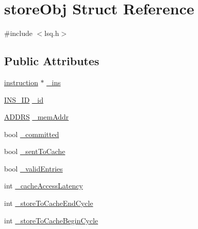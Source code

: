 \hypertarget{structstoreObj}{
\section{storeObj Struct Reference}
\label{structstoreObj}
}


{\ttfamily \#include $<$lsq.h$>$}

\subsection*{Public Attributes}
\begin{DoxyCompactItemize}
\item 
\hyperlink{classinstruction}{instruction} $\ast$ \hyperlink{structstoreObj_a418139c33f75b4d7700a61b0293518d7}{\_\-ins}
\item 
\hyperlink{global_2global_8h_a1883c47d0023d0f200e1d86eced6a070}{INS\_\-ID} \hyperlink{structstoreObj_a993d37ba4f085950507c05564bf99a6a}{\_\-id}
\item 
\hyperlink{global_2global_8h_a7ea74bb9ffd2e4d41550ae2383dd25bc}{ADDRS} \hyperlink{structstoreObj_ae4b43c4c368bb40a153821ae78f0958a}{\_\-memAddr}
\item 
bool \hyperlink{structstoreObj_a3082afbcdd75cdc3b09c9faadf0a3941}{\_\-committed}
\item 
bool \hyperlink{structstoreObj_a89e607394f02de57bd383ec70f79c1d9}{\_\-sentToCache}
\item 
bool \hyperlink{structstoreObj_a6f4f02339e252cf86524f581afb11ae9}{\_\-validEntries}
\item 
int \hyperlink{structstoreObj_a846024761d730594e3cef0d1292ddccb}{\_\-cacheAccessLatency}
\item 
int \hyperlink{structstoreObj_a585c7233f7b85b3c56ebba2a0300f037}{\_\-storeToCacheEndCycle}
\item 
int \hyperlink{structstoreObj_abe633ee683418741766efe4ad0ba1fac}{\_\-storeToCacheBeginCycle}
\end{DoxyCompactItemize}


